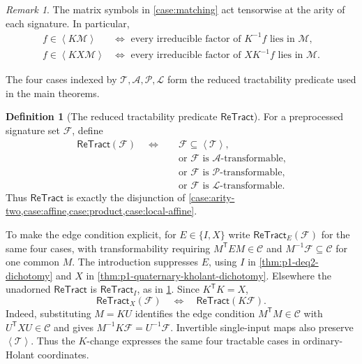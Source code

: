 \documentclass[11pt,letterpaper,onecolumn]{article}
\theoremstyle{plain}
\theoremstyle{definition}
\newtheorem{definition}[definition]{Definition}
\theoremstyle{remark}
\newtheorem{remark}[remark]{Remark}
\newcommand{\cF}{\mathcal F}
\newcommand{\cA}{\mathscr A}
\newcommand{\cP}{\mathscr P}
\newcommand{\cL}{\mathscr L}
\newcommand{\cM}{\mathscr M}
\newcommand{\cT}{\mathscr T}
\newcommand{\cC}{\mathscr C}
\newcommand{\angles}[1]{\left\langle #1\right\rangle}
\newcommand{\ReTract}{\mathsf{ReTract}}
\begin{document}
\begin{remark}
The matrix symbols in \cref{case:matching} act tensorwise at the arity of
each signature.  In particular,
\[
\begin{aligned}
 f\in\angles{K\cM}
 &\Longleftrightarrow
 \text{ every irreducible factor of }K^{-1}f\text{ lies in }\cM,\\
 f\in\angles{KX\cM}
 &\Longleftrightarrow
 \text{ every irreducible factor of }XK^{-1}f\text{ lies in }\cM.
\end{aligned}
\]
\end{remark}

The four cases indexed by \(\cT,\cA,\cP,\cL\) form the reduced
tractability predicate used in the main theorems.

\begin{definition}[The reduced tractability predicate \(\ReTract\)]
\label{def:tract-X}
For a preprocessed signature set \(\cF\), define
\hypertarget{eq:tract-X}{}
\begin{equation*}
\begin{split}
 \ReTract(\cF)\quad\Longleftrightarrow\quad
 &\cF\subseteq\angles{\cT},
 \\[-0.2em]
 &\text{or \(\cF\) is \(\cA\)-transformable,}
 \\[-0.2em]
 &\text{or \(\cF\) is \(\cP\)-transformable,}
 \\[-0.2em]
 &\text{or \(\cF\) is \(\cL\)-transformable.}
\end{split}
\end{equation*}
Thus \(\ReTract\) is exactly the disjunction of
\cref{case:arity-two,case:affine,case:product,case:local-affine}.
\end{definition}

To make the edge condition explicit, for \(E\in\{I,X\}\) write
\(\ReTract_E(\cF)\) for the same four cases, with transformability
requiring \(M^{\mathsf T}EM\in\cC\) and
\(M^{-1}\cF\subseteq\cC\) for one common \(M\).
The introduction suppresses \(E\), using \(I\) in
\cref{thm:p1-deq2-dichotomy} and \(X\) in
\cref{thm:p1-quaternary-kholant-dichotomy}. Elsewhere the unadorned
\(\ReTract\) is \(\ReTract_I\), as in \cref{def:tract-X}.
Since \(K^{\mathsf T}K=X\),
\hypertarget{eq:retract-K-coordinates}{}
\[
 \ReTract_X(\cF)\quad\Longleftrightarrow\quad\ReTract(K\cF).
\]
Indeed, substituting \(M=KU\) identifies the edge condition
\(M^{\mathsf T}M\in\cC\) with \(U^{\mathsf T}XU\in\cC\) and gives
\(M^{-1}K\cF=U^{-1}\cF\). Invertible single-input maps also preserve
\(\angles{\cT}\). Thus the \(K\)-change expresses the same four
tractable cases in ordinary-Holant coordinates.
\end{document}
